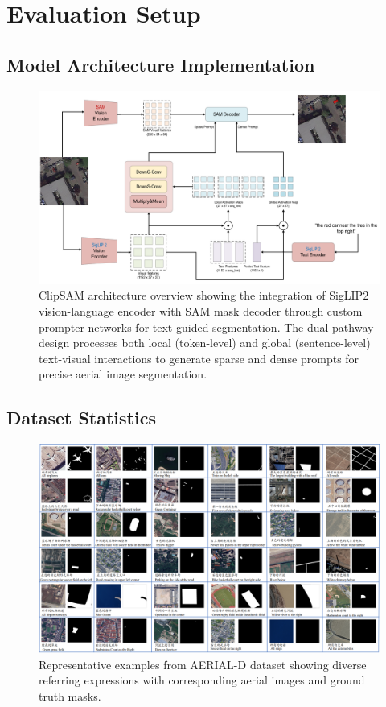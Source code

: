 \section{Evaluation Setup}

\subsection{Model Architecture Implementation}

\begin{figure}[H]
\centering
\includegraphics[width=\textwidth]{clipsam.png}
\caption{ClipSAM architecture overview showing the integration of SigLIP2 vision-language encoder with SAM mask decoder through custom prompter networks for text-guided segmentation. The dual-pathway design processes both local (token-level) and global (sentence-level) text-visual interactions to generate sparse and dense prompts for precise aerial image segmentation.}
\label{fig:rsrefseg_architecture}
\end{figure}

\subsection{Dataset Statistics}

\begin{figure}[H]
\centering
\includegraphics[width=\textwidth]{dataset.png}
\caption{Representative examples from AERIAL-D dataset showing diverse referring expressions with corresponding aerial images and ground truth masks.}
\label{fig:dataset_examples}
\end{figure}

